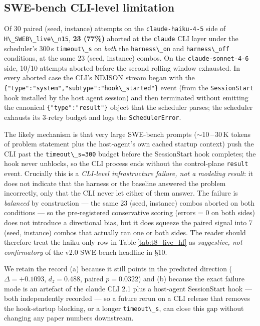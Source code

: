 \subsection{SWE-bench CLI-level limitation}\label{live-hf-sweb-cli-limitation}

Of 30 paired (seed, instance) attempts on the
\passthrough{\lstinline!claude-haiku-4-5!} side of
\passthrough{\lstinline!H\_SWEB\_live\_n15!}, \textbf{23 (77\%)}
aborted at the \passthrough{\lstinline!claude!} CLI layer under the
scheduler's 300\,s \passthrough{\lstinline!timeout\_s!} on \emph{both}
the \passthrough{\lstinline!harness\_on!} and
\passthrough{\lstinline!harness\_off!} conditions, at the same 23
(seed, instance) combos. On the
\passthrough{\lstinline!claude-sonnet-4-6!} side, 10/10 attempts
aborted before the second rolling window exhausted. In every aborted
case the CLI's NDJSON stream began with the
\passthrough{\lstinline!\{"type":"system","subtype":"hook\_started"\}!}
event (from the
\passthrough{\lstinline!SessionStart!} hook installed by the host
agent session) and then terminated without emitting the canonical
\passthrough{\lstinline!\{"type":"result"\}!} object that the scheduler
parses; the scheduler exhausts its 3-retry budget and logs the
\passthrough{\lstinline!SchedulerError!}.

The likely mechanism is that very large SWE-bench prompts
(\(\sim\)10\,--\,30\,K tokens of problem statement plus the
host-agent's own cached startup context) push the CLI past the
\passthrough{\lstinline!timeout\_s=300!} budget before the
SessionStart hook completes; the hook never unblocks, so the CLI
process ends without the control-plane \passthrough{\lstinline!result!}
event. Crucially this is a \emph{CLI-level infrastructure failure, not
a modeling result}: it does not indicate that the harness or the
baseline answered the problem incorrectly, only that the CLI never let
either of them answer. The failure is \emph{balanced} by construction
--- the same 23 (seed, instance) combos aborted on both conditions ---
so the pre-registered conservative scoring (errors = 0 on both sides)
does not introduce a directional bias, but it does squeeze the paired
signal into 7 (seed, instance) combos that actually ran one or both
sides. The reader should therefore treat the haiku-only row in
Table\,\ref{tab:t8_live_hf} as \emph{suggestive, not confirmatory} of
the v2.0 SWE-bench headline in §10.

We retain the record (a) because it still points in the predicted
direction ($\Delta=+0.1093$, $d_z=0.488$, paired $p=0.0322$) and (b)
because the exact failure mode is an artefact of the
claude CLI 2.1 plus a host-agent SessionStart hook --- both
independently recorded --- so a future rerun on a CLI release that
removes the hook-startup blocking, or a longer
\passthrough{\lstinline!timeout\_s!}, can close this gap without
changing any paper numbers downstream.

